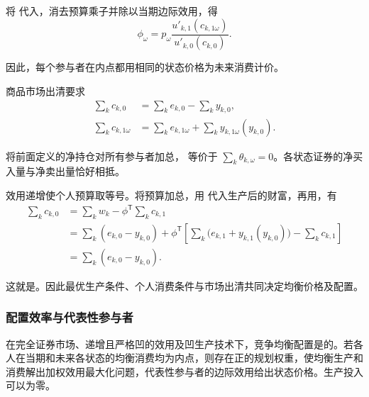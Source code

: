将 代入，消去预算乘子并除以当期边际效用，得
\[
 \phi_\omega=p_\omega
 \frac{u'_{k,1}(c_{k,1\omega})}{u'_{k,0}(c_{k,0})}.
\]

因此，每个参与者在内点都用相同的状态价格为未来消费计价。

商品市场出清要求
\begin{subequations}\label{eq:wj-15-7}
\begin{align}
 \sum_kc_{k,0}&=\sum_ke_{k,0}-\sum_ky_{k,0},\label{eq:wj-15-7a}\\
 \sum_kc_{k,1\omega}&=\sum_ke_{k,1\omega}+\sum_ky_{k,1\omega}(y_{k,0}).\label{eq:wj-15-7b}
\end{align}
\end{subequations}

将前面定义的净持仓对所有参与者加总， 等价于 $\sum_k\theta_{k,\omega}=0$。各状态证券的净买入量与净卖出量恰好相抵。

效用递增使个人预算取等号。将预算加总，用 代入生产后的财富，再用，有
\[
 \begin{aligned}
 \sum_k c_{k,0}
 &=\sum_k w_k-\phi^{\mathsf T}\sum_k c_{k,1}\\
 &=\sum_k(e_{k,0}-y_{k,0})
 +\phi^{\mathsf T}\left[\sum_k\bigl(e_{k,1}+y_{k,1}(y_{k,0})\bigr)-\sum_k c_{k,1}\right]\\
 &=\sum_k(e_{k,0}-y_{k,0}).
 \end{aligned}
\]

这就是。因此最优生产条件、个人消费条件与市场出清共同决定均衡价格及配置。

\subsubsection{配置效率与代表性参与者}
\begin{tcolorbox}[knowledge]
 在完全证券市场、递增且严格凹的效用及凹生产技术下，竞争均衡配置是的。若各人在当期和未来各状态的均衡消费均为内点，则存在正的规划权重，使均衡生产和消费解出加权效用最大化问题，代表性参与者的边际效用给出状态价格。生产投入可以为零。
\end{tcolorbox}

